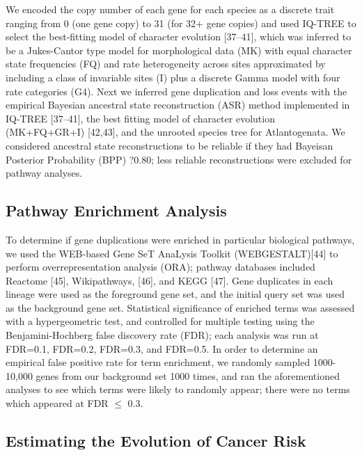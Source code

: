 \documentclass[]{elsarticle} %
\begin{document}
We encoded the copy number of each gene for each species as a discrete trait ranging from 0 (one gene copy) to 31 (for 32+ gene copies) and used IQ-TREE to select the best-fitting model of character evolution {[}37--41{]}, which was inferred to be a Jukes-Cantor type model for morphological data (MK) with equal character state frequencies (FQ) and rate heterogeneity across sites approximated by including a class of invariable sites (I) plus a discrete Gamma model with four rate categories (G4). Next we inferred gene duplication and loss events with the empirical Bayesian ancestral state reconstruction (ASR) method implemented in IQ-TREE {[}37--41{]}, the best fitting model of character evolution (MK+FQ+GR+I) {[}42,43{]}, and the unrooted species tree for Atlantogenata. We considered ancestral state reconstructions to be reliable if they had Bayeisan Posterior Probability (BPP) ?0.80; less reliable reconstructions were excluded for pathway analyses.

\hypertarget{pathway-enrichment-analysis}{%
\subsection{Pathway Enrichment Analysis}\label{pathway-enrichment-analysis}}

To determine if gene duplications were enriched in particular biological pathways, we used the WEB-based Gene SeT AnaLysis Toolkit (WEBGESTALT){[}44{]} to perform overrepresentation analysis (ORA); pathway databases included Reactome {[}45{]}, Wikipathways, {[}46{]}, and KEGG {[}47{]}. Gene duplicates in each lineage were used as the foreground gene set, and the initial query set was used as the background gene set. Statistical significance of enriched terms was assessed with a hypergeometric test, and controlled for multiple testing using the Benjamini-Hochberg false discovery rate (FDR); each analysis was run at FDR=0.1, FDR=0.2, FDR=0.3, and FDR=0.5. In order to determine an empirical false positive rate for term enrichment, we randomly sampled 1000-10,000 genes from our background set 1000 times, and ran the aforementioned analyses to see which terms were likely to randomly appear; there were no terms which appeared at FDR \(\leq\) 0.3.

\hypertarget{estimating-the-evolution-of-cancer-risk}{%
\subsection{Estimating the Evolution of Cancer Risk}\label{estimating-the-evolution-of-cancer-risk}}
\end{document}
